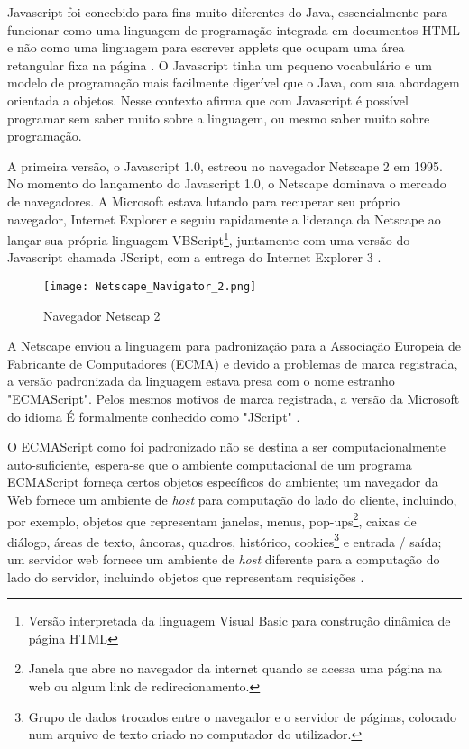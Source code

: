 Javascript foi concebido para fins muito diferentes do Java, essencialmente para funcionar como uma linguagem de programação integrada em documentos HTML e não como uma linguagem para escrever applets que ocupam uma área retangular fixa na página \cite{goodman2007javascript}. O Javascript tinha um pequeno vocabulário e um modelo de programação mais facilmente digerível que o Java, com sua abordagem orientada a objetos. Nesse contexto  afirma que com Javascript é possível programar sem saber muito sobre a linguagem, ou mesmo saber muito sobre programação.

A primeira versão, o Javascript 1.0, estreou no navegador Netscape 2 em 1995. No momento do lançamento do Javascript 1.0, o Netscape dominava o mercado de navegadores. A Microsoft estava lutando para recuperar seu próprio navegador, Internet Explorer e seguiu rapidamente a liderança da Netscape ao lançar sua própria linguagem VBScript\footnote{Versão interpretada da linguagem Visual Basic para construção dinâmica de página HTML}, juntamente com uma versão do Javascript chamada JScript, com a entrega do Internet Explorer 3 \cite{keith2010dom}.

\begin{figure}[!htb]
	\centering
	\texttt{[image: Netscape\_Navigator\_2.png]}
	\caption{Navegador Netscap 2}
	\label{Netscape}
\end{figure}

A Netscape enviou a linguagem para padronização para a Associação Europeia de Fabricante de Computadores (ECMA) e devido a problemas de marca registrada, a versão padronizada da linguagem estava presa com o nome estranho "ECMAScript". Pelos mesmos motivos de marca registrada, a versão da Microsoft do idioma É formalmente conhecido como "JScript" \cite{flanagan2011javascript}.

O ECMAScript como foi padronizado não se destina a ser computacionalmente auto-suficiente, espera-se que o ambiente computacional de um programa ECMAScript forneça certos objetos específicos do ambiente; um navegador da Web fornece um ambiente de \emph{host} para computação do lado do cliente, incluindo, por exemplo, objetos que representam janelas, menus, pop-ups\footnote{Janela que abre no navegador da internet quando se acessa uma página na web ou algum link de redirecionamento.}, caixas de diálogo, áreas de texto, âncoras, quadros, histórico, cookies\footnote{Grupo de dados trocados entre o navegador e o servidor de páginas, colocado num arquivo de texto criado no computador do utilizador.} e entrada / saída; um servidor web fornece um ambiente de \emph{host} diferente para a computação do lado do servidor, incluindo objetos que representam requisições \cite{ecmascript2016}.

